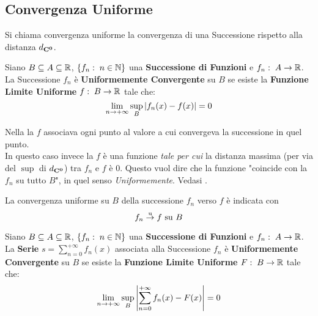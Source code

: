 \subsection{Convergenza Uniforme}\label{sect:conv_unif}
Si chiama convergenza uniforme la convergenza di una Successione rispetto alla distanza $d_{\mathbf{C^{0}}}$.

\begin{definition}
	\label{def:succ_unif_conv}
	Siano $B \subseteq A \subseteq \mathbb{R}$, $\left\{f_n:\; n \in \mathbb{N}\right\}$ una \textbf{Successione di Funzioni} e $f_n:\; A \to \mathbb{R}$.\\
	La Successione $f_n$ è \textbf{Uniformemente Convergente} su $B$ se esiste la \textbf{Funzione Limite Uniforme} $f:\; B \to \mathbb{R}$ tale che:
	\[\lim\limits_{n \to +\infty} \sup\limits_{B} \left|f_n(x) - f(x)\right| = 0\]
	\begin{note}
		Nella  la $f$ associava ogni punto al valore a cui convergeva la successione in quel punto.\\
		In questo caso invece la $f$ è una funzione \textit{tale per cui} la distanza massima (per via del $\sup$ di $d_{\mathbf{C^{0}}}$) tra $f_n$ e $f$ è $0$. Questo vuol dire che la funzione "coincide con la $f_n$ su tutto $B$", in quel senso \textit{Uniformemente}. Vedasi .
	\end{note}
	La convergenza uniforme su $B$ della successione $f_n$ verso $f$ è indicata con
	\[f_n \overset{\text{u}}{\to} f \text{ su } B\]
\end{definition}
\begin{definition}
	Siano $B \subseteq A \subseteq \mathbb{R}$, $\left\{f_n:\; n \in \mathbb{N}\right\}$ una \textbf{Successione di Funzioni} e $f_n:\; A \to \mathbb{R}$.\\
	La \textbf{Serie} $s = \sum\limits_{n = 0}^{+\infty} f_n(x)$ associata alla Successione $f_n$ è \textbf{Uniformemente Convergente} su $B$ se esiste la \textbf{Funzione Limite Uniforme} $F:\; B \to \mathbb{R}$ tale che:
	\[\lim\limits_{n \to +\infty} \sup\limits_{B} \left|\sum\limits_{n = 0}^{+\infty} f_n(x) - F(x)\right| = 0\]
\end{definition}


